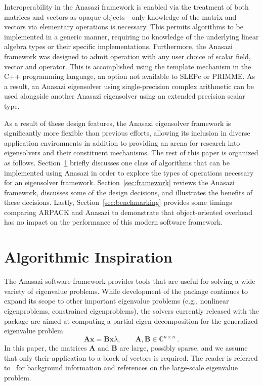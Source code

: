 \documentclass[acmtoms]{acmtrans2m}
\newcounter{algorithm}
\begin{document}
Interoperability in the Anasazi framework is enabled via the treatment of both matrices and 
vectors as opaque objects---only knowledge of the matrix and vectors via elementary operations 
is necessary. This permits algorithms to be implemented in a generic manner, requiring no
knowledge of the underlying linear algebra types or their specific implementations.
Furthermore, the Anasazi framework was designed to admit operation with any user choice
of scalar field, vector and operator. This is accomplished using the template mechanism in
the C++ programming language, an option not available to SLEPc or PRIMME. As a result, an
Anasazi eigensolver using single-precision complex arithmetic can be used alongside
another Anasazi eigensolver using an extended precision scalar type. 

As a result of these design features, the Anasazi eigensolver framework is significantly
more flexible than previous efforts, allowing its inclusion in diverse application
environments in addition to providing an arena for research into eigensolvers and their
constituent mechanisms.  The rest of this paper is organized as follows.
Section~\ref{sec:algorithm-overview} briefly discusses one class of algorithms that can be
implemented using Anasazi in order to explore the types of operations necessary for an
eigensolver framework.  Section~\ref{sec:framework} reviews the Anasazi framework,
discusses some of the design decisions, and illustrates the benefits of these decisions.
Lastly, Section~\ref{sec:benchmarking} provides some timings comparing ARPACK and Anasazi
to demonstrate that object-oriented overhead has no impact on the performance of this
modern software framework.


\section{Algorithmic Inspiration}
\label{sec:algorithm-overview}

The Anasazi software framework provides tools that are useful for solving a wide variety
of eigenvalue problems. While development of the package continues to expand its scope to
other important eigenvalue problems (e.g., nonlinear eigenproblems, constrained
eigenproblems), the solvers currently released with the package are aimed at computing a
partial eigen-decomposition for the generalized eigenvalue problem
\begin{equation}  \label{eq:intro.1}
  \mathbf{A} \mathbf{x} = \mathbf{B} \mathbf{x} \lambda , \qquad
  \mathbf{A}, \mathbf{B} \in \mathbb{C}^{n\times n}\ .
\end{equation}
In this paper, the matrices $\mathbf{A}$ and $\mathbf{B}$ are large, possibly sparse, and
we assume that only their application to a block of vectors is required. The reader is
referred to~\cite{saad:92,sore:02,stew:01book,vors:02} for background information and
references on the large-scale eigenvalue problem.
\end{document}
